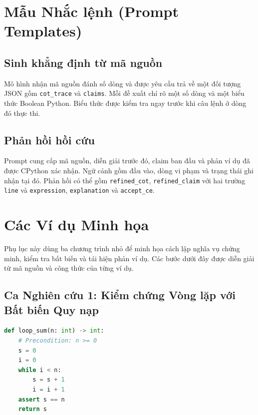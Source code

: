 \chapter{Mẫu Nhắc lệnh (Prompt Templates)}
\label{app:prompt_templates}

\section{Sinh khẳng định từ mã nguồn}
Mô hình nhận mã nguồn đánh số dòng và được yêu cầu trả về một đối tượng JSON gồm \texttt{cot\_trace} và \texttt{claims}. Mỗi đề xuất chỉ rõ một số dòng và một biểu thức Boolean Python. Biểu thức được kiểm tra ngay trước khi câu lệnh ở dòng đó thực thi.

\section{Phản hồi hồi cứu}
Prompt cung cấp mã nguồn, diễn giải trước đó, claim ban đầu và phản ví dụ đã được CPython xác nhận. Ngữ cảnh gồm đầu vào, dòng vi phạm và trạng thái ghi nhận tại đó. Phản hồi có thể gồm \texttt{refined\_cot}, \texttt{refined\_claim} với hai trường \texttt{line} và \texttt{expression}, \texttt{explanation} và \texttt{accept\_ce}.

\chapter{Các Ví dụ Minh họa}
\label{app:case_studies}

Phụ lục này dùng ba chương trình nhỏ để minh họa cách lập nghĩa vụ chứng minh, kiểm tra bất biến và tái hiện phản ví dụ. Các bước dưới đây được diễn giải từ mã nguồn và công thức của từng ví dụ.

\section{Ca Nghiên cứu 1: Kiểm chứng Vòng lặp với Bất biến Quy nạp}
\begin{lstlisting}[language=Python, caption={Mã nguồn bài toán loop\_sum\_safe}]
def loop_sum(n: int) -> int:
    # Precondition: n >= 0
    s = 0
    i = 0
    while i < n:
        s = s + 1
        i = i + 1
    assert s == n
    return s
\end{lstlisting}

